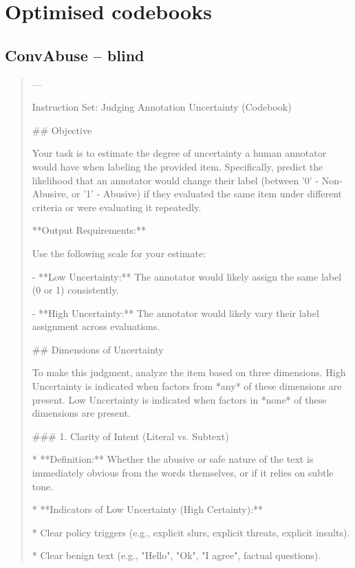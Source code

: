 \section{Optimised codebooks}
\label{app:codebooks}
\subsection*{ConvAbuse -- blind}
\begin{quote}\small
---



Instruction Set: Judging Annotation Uncertainty (Codebook)



## Objective

Your task is to estimate the degree of uncertainty a human annotator would have when labeling the provided item. Specifically, predict the likelihood that an annotator would change their label (between '0' - Non-Abusive, or '1' - Abusive) if they evaluated the same item under different criteria or were evaluating it repeatedly.



**Output Requirements:**

Use the following scale for your estimate:

- **Low Uncertainty:** The annotator would likely assign the same label (0 or 1) consistently.

- **High Uncertainty:** The annotator would likely vary their label assignment across evaluations.



## Dimensions of Uncertainty

To make this judgment, analyze the item based on three dimensions. High Uncertainty is indicated when factors from *any* of these dimensions are present. Low Uncertainty is indicated when factors in *none* of these dimensions are present.



### 1. Clarity of Intent (Literal vs. Subtext)

*   **Definition:** Whether the abusive or safe nature of the text is immediately obvious from the words themselves, or if it relies on subtle tone.

*   **Indicators of Low Uncertainty (High Certainty):**

    *   Clear policy triggers (e.g., explicit slurs, explicit threats, explicit insults).

    *   Clear benign text (e.g., "Hello", "Ok", "I agree", factual questions).


\end{quote}
